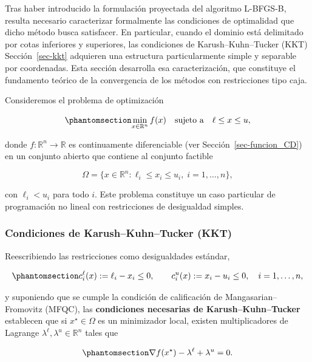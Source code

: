 \documentclass[
  spanish,
  us-letterpaper,
]{scrreprt}
\numberwithin{equation}{section}
\begin{document}
Tras haber introducido la formulación proyectada del algoritmo L-BFGS-B,
resulta necesario caracterizar formalmente las condiciones de
optimalidad que dicho método busca satisfacer. En particular, cuando el
dominio está delimitado por cotas inferiores y superiores, las
condiciones de Karush--Kuhn--Tucker (KKT) Sección~\ref{sec-kkt}
adquieren una estructura particularmente simple y separable por
coordenadas. Esta sección desarrolla esa caracterización, que constituye
el fundamento teórico de la convergencia de los métodos con
restricciones tipo caja.

Consideremos el problema de optimización

\begin{equation}\phantomsection\label{eq-26}{
\min_{x \in \mathbb{R}^n} f(x)
\quad \text{sujeto a} \quad
\ell \le x \le u,
}\end{equation}

donde \(f: \mathbb{R}^n \to \mathbb{R}\) es continuamente diferenciable
(ver Sección~\ref{sec-funcion_CD}) en un conjunto abierto que contiene
al conjunto factible

\[
\Omega = \{x \in \mathbb{R}^n : \ell_i \le x_i \le u_i,\; i=1,\dots,n\},
\]

con \(\ell_i < u_i\) para todo \(i\). Este problema constituye un caso
particular de programación no lineal con restricciones de desigualdad
simples.

\subsubsection{Condiciones de Karush--Kuhn--Tucker
(KKT)}\label{condiciones-de-karushkuhntucker-kkt}

Reescribiendo las restricciones como desigualdades estándar,

\begin{equation}\phantomsection\label{eq-27}{
c_i^{\ell}(x) := \ell_i - x_i \le 0, \qquad
c_i^{u}(x) := x_i - u_i \le 0, \quad i = 1,\dots,n,
}\end{equation}

y suponiendo que se cumple la condición de calificación de
Mangasarian--Fromovitz (MFQC), las \textbf{condiciones necesarias de
Karush--Kuhn--Tucker} establecen que si \(x^\star \in \Omega\) es un
minimizador local, existen multiplicadores de Lagrange
\(\lambda^\ell, \lambda^u \in \mathbb{R}^n\) tales que

\begin{equation}\phantomsection\label{eq-kkt-a}{
\nabla f(x^\star) - \lambda^\ell + \lambda^u = 0.
}\end{equation}
\end{document}
